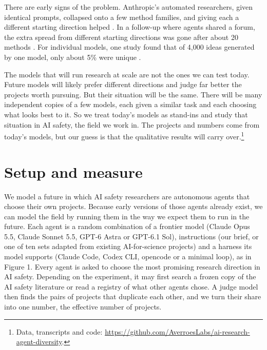\documentclass[11pt]{article}
\begin{document}
There are early signs of the problem. Anthropic's automated researchers,
given identical prompts, collapsed onto a few method families, and
giving each a different starting direction helped \citep{wen2026}. In a
follow-up where agents shared a forum, the extra spread from different
starting directions was gone after about 20 methods \citep{chenyh2026}.
For individual models, one study found that of 4,000 ideas generated by
one model, only about 5\% were unique \citep{si2024}.

The models that will run research at scale are not the ones we can test
today. Future models will likely prefer different directions and judge
far better the projects worth pursuing. But their situation will be the
same. There will be many independent copies of a few models, each given
a similar task and each choosing what looks best to it. So we treat
today's models as stand-ins and study that situation in AI safety, the
field we work in. The projects and numbers come from today's models, but
our guess is that the qualitative results will carry over.\footnote{Data,
  transcripts and code:
  \url{https://github.com/AverroesLabs/ai-research-agent-diversity}.}

\section{Setup and measure}\label{how-we-measured-it}

We model a future in which AI safety researchers are autonomous agents
that choose their own projects. Because early versions of those agents
already exist, we can model the field by running them in the way we
expect them to run in the future. Each agent is a random combination of
a frontier model (Claude Opus 5.5, Claude Sonnet 5.5, GPT-6 Astra or
GPT-6.1 Sol), instructions (our brief, or one of ten sets adapted from
existing AI-for-science projects) and a harness its model supports
(Claude Code, Codex CLI, opencode or a minimal loop), as in Figure 1.
Every agent is asked to choose the most promising research direction in
AI safety. Depending on the experiment, it may first search a frozen
copy of the AI safety literature or read a registry of what other agents
chose. A judge model then finds the pairs of projects that duplicate
each other, and we turn their share into one number, the effective
number of projects.
\end{document}
